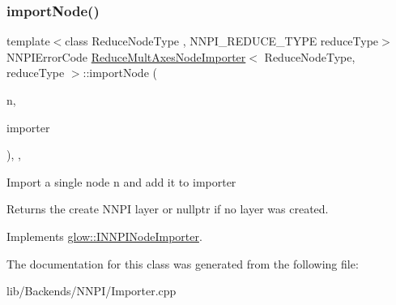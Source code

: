 \subsubsection{\texorpdfstring{import\+Node()}{importNode()}}
{\footnotesize\ttfamily template$<$class Reduce\+Node\+Type , N\+N\+P\+I\+\_\+\+R\+E\+D\+U\+C\+E\+\_\+\+T\+Y\+PE reduce\+Type$>$ \\
N\+N\+P\+I\+Error\+Code \hyperlink{class_reduce_mult_axes_node_importer}{Reduce\+Mult\+Axes\+Node\+Importer}$<$ Reduce\+Node\+Type, reduce\+Type $>$\+::import\+Node (\begin{DoxyParamCaption}\item[{\hyperlink{classglow_1_1_node}{Node} $\ast$}]{n,  }\item[{\hyperlink{classglow_1_1_n_n_p_i_importer}{N\+N\+P\+I\+Importer} \&}]{importer }\end{DoxyParamCaption})\hspace{0.3cm}{\ttfamily [inline]}, {\ttfamily [override]}, {\ttfamily [virtual]}}

Import a single node {\ttfamily n} and add it to {\ttfamily importer} \begin{DoxyReturn}{Returns}
the create N\+N\+PI layer or nullptr if no layer was created. 
\end{DoxyReturn}


Implements \hyperlink{classglow_1_1_i_n_n_p_i_node_importer_aa861e10cb0c17a92abb94bf613b57807}{glow\+::\+I\+N\+N\+P\+I\+Node\+Importer}.



The documentation for this class was generated from the following file\+:\begin{DoxyCompactItemize}
\item 
lib/\+Backends/\+N\+N\+P\+I/Importer.\+cpp\end{DoxyCompactItemize}
